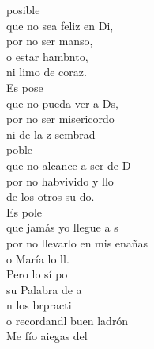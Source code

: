 \documentclass[12pt]{article}
\begin{document}
\begin{multicols*}{2}
\begin{cancion}%
	posible\\
	que no sea feliz en Di,\\
por no ser manso, \\
	o estar hambnto,\\
	ni limo de coraz.\\
\jump
	Es pose\\
	que no pueda ver a Ds,\\
	por no ser misericordo\\
	ni de la z sembrad\\
\jump
	 poble\\
	que no alcance a ser de D\\
	por no habvivido y llo\\
	de los otros su do.\\
\jump
	Es pole\\
	que jamás yo llegue a s\\
	por no llevarlo en mis enañas\\
	o María lo ll.\\
\jump
	Pero lo sí po \\
	su Palabra de a\\
	n los brpracti  \\
	o recordandl buen ladrón \\
	Me fío aiegas del\\
\jump
	         \\
\end{cancion}%


\end{multicols*}
\end{document}
